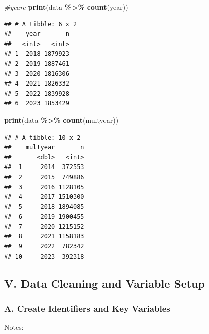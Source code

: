 \documentclass[
]{article}
\newenvironment{Shaded}{\begin{snugshade}}{\end{snugshade}}
\newcommand{\CommentTok}[1]{\textcolor[rgb]{0.56,0.35,0.01}{\textit{#1}}}
\newcommand{\FunctionTok}[1]{\textcolor[rgb]{0.13,0.29,0.53}{\textbf{#1}}}
\newcommand{\NormalTok}[1]{#1}
\newcommand{\SpecialCharTok}[1]{\textcolor[rgb]{0.81,0.36,0.00}{\textbf{#1}}}
\begin{document}
\begin{Shaded}
\begin{Highlighting}[]
\CommentTok{\#yeare}
\FunctionTok{print}\NormalTok{(data }\SpecialCharTok{\%\textgreater{}\%} \FunctionTok{count}\NormalTok{(year))}
\end{Highlighting}
\end{Shaded}

\begin{verbatim}
## # A tibble: 6 x 2
##    year       n
##   <int>   <int>
## 1  2018 1879923
## 2  2019 1887461
## 3  2020 1816306
## 4  2021 1826332
## 5  2022 1839928
## 6  2023 1853429
\end{verbatim}

\begin{Shaded}
\begin{Highlighting}[]
\FunctionTok{print}\NormalTok{(data }\SpecialCharTok{\%\textgreater{}\%} \FunctionTok{count}\NormalTok{(multyear))}
\end{Highlighting}
\end{Shaded}

\begin{verbatim}
## # A tibble: 10 x 2
##    multyear       n
##       <dbl>   <int>
##  1     2014  372553
##  2     2015  749886
##  3     2016 1128105
##  4     2017 1510300
##  5     2018 1894085
##  6     2019 1900455
##  7     2020 1215152
##  8     2021 1158183
##  9     2022  782342
## 10     2023  392318
\end{verbatim}

\subsection{V. Data Cleaning and Variable
Setup}\label{v.-data-cleaning-and-variable-setup}

\subsubsection{A. Create Identifiers and Key
Variables}\label{a.-create-identifiers-and-key-variables}

Notes:
\end{document}
